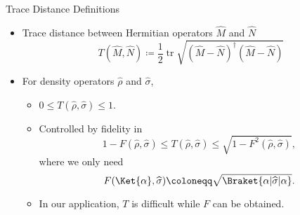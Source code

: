 \documentclass{beamer}
\newcommand{\rbr}[1]{{\left(#1\right)}}
\newcommand{\rfun}[2]{{#1}\mathopen{}\left(#2\right)\mathclose{}}
\newcommand{\what}[1]{{\widehat{#1}}}
\DeclareMathOperator{\tr}{tr}
\begin{document}
\begin{frame}{Trace Distance \cite[ch.~9]{Wilde2009}}{Definitions}
\begin{itemize}
\item Trace distance between Hermitian operators $\what{M}$ and $\what{N}$
\begin{equation}
\rfun{T}{\what{M}, \what{N}} \coloneqq \frac{1}{2} 
\tr \sqrt{\rbr{\what{M}-\what{N}}^\dagger\rbr{\what{M}-\what{N}}}
\label{eq:def-trace-dist}
\end{equation}
\item For \alert{density operators} $\what{\rho}$ and $\what{\sigma}$,
\begin{itemize}
\item $0 \le \rfun{T}{\what{\rho}, \what{\sigma}} \le 1.$
\item Controlled by \alert{fidelity} in \cite{Fuchs1999}
\begin{equation}
1 - \rfun{F}{\what{\rho},\what{\sigma}} \le \rfun{T}{\what{\rho},\what{\sigma}}
\le \sqrt{1 - \rfun{F^2}{\what{\rho},\what{\sigma}}},
\label{eq:ineq-fvdg}
\end{equation}
where we only need
\begin{equation}
\rfun{F}{\Ket{\alpha},\what{\sigma}} \coloneqq \sqrt{\Braket{\alpha | 
\what{\sigma} | \alpha}}.
\end{equation}
\item In our application, $T$ is difficult while $F$ can be obtained.
\end{itemize}
\end{itemize}
\end{frame}
\end{document}
